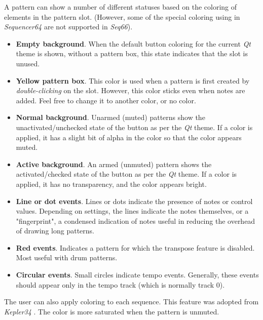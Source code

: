    A pattern can show a number of different statuses based on the coloring
   of elements in the pattern slot.
   (However, some of the special coloring using in
   \textsl{Sequencer64} are not supported in \textsl{Seq66}).

   \begin{itemize}
      \item \textbf{Empty background}.
         When the default button coloring for
         the current \textsl{Qt} theme is shown, without a pattern box,
         this state indicates that the slot is unused.
      \item \textbf{Yellow pattern box}.
         This color is used when a pattern is
         first created by \textsl{double-clicking} on the slot.
         However, this color sticks even when notes are added.
         Feel free to change it to another color, or no color.
      \item \textbf{Normal background}.
         Unarmed (muted) patterns show the
         unactivated/unchecked state of the button as per the \textsl{Qt}
         theme.  If a color is applied, it has a slight bit of alpha in the
         color so that the color appears muted.
      \item \textbf{Active background}.
         An armed (unmuted) pattern shows the
         activated/checked state of the button as per the \textsl{Qt}
         theme.  If a color is applied, it has no transparency, and the 
         color appears bright.
      \item \textbf{Line or dot events}.
         Lines or dots indicate the presence of notes or control
         values.  Depending on settings, the
         lines indicate the notes themselves, or a "fingerprint", a condensed
         indication of notes useful in reducing the overhead of
         drawing long patterns.
      \item \textbf{Red events}.
         Indicates a pattern for which the transpose feature is
         disabled.  Most useful with drum patterns.
      \item \textbf{Circular events}.
         Small circles indicate tempo events.  Generally, these events should
         appear only in the tempo track (which is normally track 0).
   \end{itemize}

   The user can also apply coloring to each sequence.
   This feature was adopted from \textsl{Kepler34} \cite{kepler34}.
   The color is more saturated when the pattern is unmuted.

